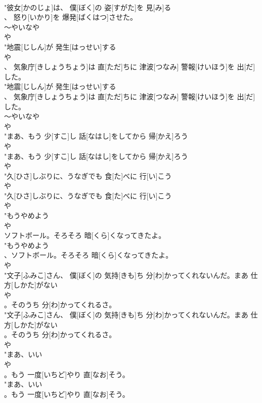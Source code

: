 \documentclass[8pt]{extreport}
\begin{document}
\begin{CJK}{UTF8}{min}
\\	"彼女[かのじょ]は、 僕[ぼく]の 姿[すがた]を 見[み]る
\\	、 怒り[いかり]を 爆発[ばくはつ]させた。
\\	～やいなや 
\\	や
\\	"地震[じしん]が 発生[はっせい]する
\\	や
\\	、 気象庁[きしょうちょう]は 直[ただ]ちに 津波[つなみ] 警報[けいほう]を 出[だ]した。
\\	"地震[じしん]が 発生[はっせい]する
\\	、 気象庁[きしょうちょう]は 直[ただ]ちに 津波[つなみ] 警報[けいほう]を 出[だ]した。
\\	～やいなや 
\\	や
\\	"まあ、もう 少[すこ]し 話[なはし]をしてから 帰[かえ]ろう
\\	や
\\	"まあ、もう 少[すこ]し 話[なはし]をしてから 帰[かえ]ろう
\\	や
\\	"久[ひさ]しぶりに、うなぎでも 食[た]べに 行[い]こう
\\	や
\\	"久[ひさ]しぶりに、うなぎでも 食[た]べに 行[い]こう
\\	や
\\	"もうやめよう
\\	や
\\	ソフトボール。そろそろ 暗[くら]くなってきたよ。
\\	"もうやめよう
\\	、ソフトボール。そろそろ 暗[くら]くなってきたよ。
\\	や
\\	"文子[ふみこ]さん、 僕[ぼく]の 気持[きも]ち 分[わ]かってくれないんだ。まあ 仕方[しかた]がない
\\	や
\\	。そのうち 分[わ]かってくれるさ。
\\	"文子[ふみこ]さん、 僕[ぼく]の 気持[きも]ち 分[わ]かってくれないんだ。まあ 仕方[しかた]がない
\\	。そのうち 分[わ]かってくれるさ。
\\	や
\\	"まあ、いい
\\	や
\\	。もう 一度[いちど]やり 直[なお]そう。
\\	"まあ、いい
\\	。もう 一度[いちど]やり 直[なお]そう。

\end{CJK}
\end{document}
